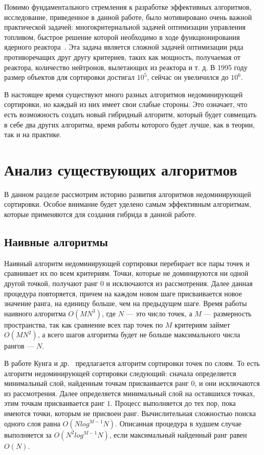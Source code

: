 Помимо фундаментального стремления к разработке эффективных алгоритмов, исследование, приведенное в данной работе, было мотивировано очень важной практической задачей: многокритериальной задачей оптимизации управления топливом, быстрое решение которой необходимо в ходе функционирования ядерного реактора~\cite{Schlunz}. Эта задача является сложной задачей оптимизации ряда противоречащих друг другу критериев, таких как мощность, получаемая от реактора, количество нейтронов, вылетающих из реактора и т. д. В 1995 году размер объектов для сортировки достигал $10^5$, сейчас он увеличился до $10^6$.

В настоящее время существуют много разных алгоритмов недоминирующей сортировки, но каждый из них имеет свои слабые стороны. Это означает, что есть возможность создать новый гибридный алгоритм, который будет совмещать в себе два других алгоритма, время работы которого будет лучше, как в теории, так и на практике.

\section{Анализ существующих алгоритмов}

В данном разделе рассмотрим историю развития алгоритмов недоминирующей сортировки. Особое внимание будет уделено самым эффективным алгоритмам, которые применяются для создания гибрида в данной работе.

\subsection{Наивные алгоритмы}

Наивный алгоритм недоминирующей сортировки перебирает все пары точек и сравнивает их по всем критериям. Точки, которые не доминируются ни одной другой точкой, получают ранг $0$ и исключаются из рассмотрения. Далее данная процедура повторяется, причем на каждом новом шаге присваивается новое значение ранга, на единицу больше, чем на предыдущем шаге. Время работы наивного алгоритма $O(MN^3)$, где $N$ {---} это число точек, а $M$ {---} размерность пространства, так как сравнение всех пар точек по $M$ критериям займет $O(MN^2)$, а всего шагов алгоритма будет не больше максимального числа рангов {---} $N$.

В работе Кунга и др.~\cite{Kung} предлагается алгоритм сортировки точек по слоям. То есть алгоритм недоминирующей сортировки следующий: сначала определяется минимальный слой, найденным точкам присваивается ранг $0$, и они исключаются из рассмотрения. Далее определяется минимальный слой на оставшихся точках, этим точкам присваивается ранг $1$. Процесс выполняется до тех пор, пока имеются точки, которым не присвоен ранг. Вычислительная сложностью поиска одного слоя равна $O(N log^{M-1} N)$. Описанная процедура в худшем случае выполняется за $O(N^2 log^{M-1} N)$, если максимальный найденный ранг равен $O(N)$.

